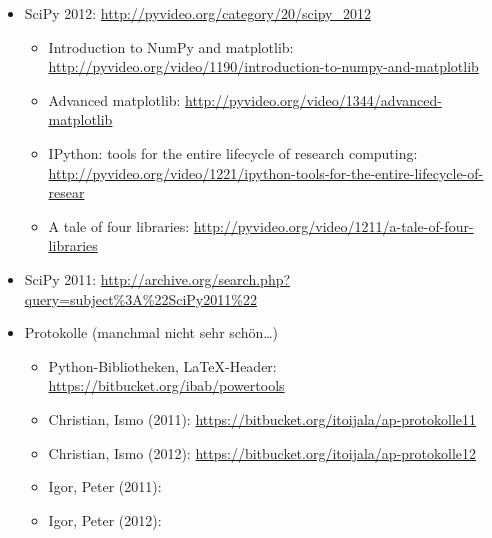\begin{itemize}
\begin{itemize}
    \end{itemize}
  \item SciPy 2012: \url{http://pyvideo.org/category/20/scipy\_2012}
    \begin{itemize}
      \item Introduction to NumPy and matplotlib: \url{http://pyvideo.org/video/1190/introduction-to-numpy-and-matplotlib}
      \item Advanced matplotlib: \url{http://pyvideo.org/video/1344/advanced-matplotlib}
      \item IPython: tools for the entire lifecycle of research computing: \url{http://pyvideo.org/video/1221/ipython-tools-for-the-entire-lifecycle-of-resear}
      \item A tale of four libraries: \url{http://pyvideo.org/video/1211/a-tale-of-four-libraries}
    \end{itemize}
  \item SciPy 2011: \url{http://archive.org/search.php?query=subject\%3A\%22SciPy2011\%22}
  \item Protokolle (manchmal nicht sehr schön…)
    \begin{itemize}
      \item Python-Bibliotheken, \LaTeX-Header: \url{https://bitbucket.org/ibab/powertools}
      \item Christian, Ismo (2011): \url{https://bitbucket.org/itoijala/ap-protokolle11}
      \item Christian, Ismo (2012): \url{https://bitbucket.org/itoijala/ap-protokolle12}
      \item Igor, Peter (2011): \url{}
      \item Igor, Peter (2012): \url{}
    \end{itemize}
\end{itemize}
